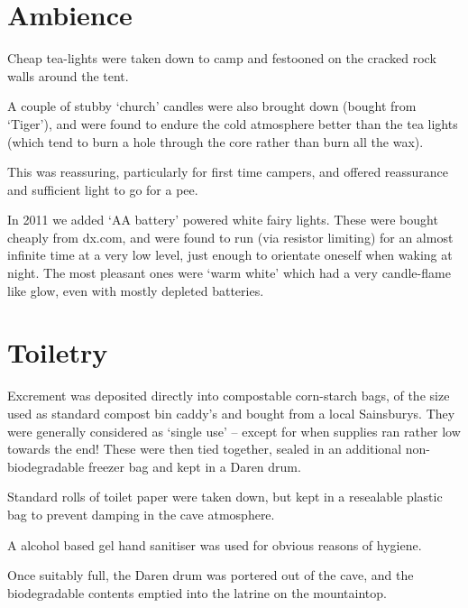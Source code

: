 \section{Ambience}

Cheap tea-lights were taken down to camp and festooned on the cracked rock walls around the tent.

A couple of stubby `church' candles were also brought down (bought from `Tiger'), and were found to endure the cold atmosphere better than the tea lights (which tend to burn a hole through the core rather than burn all the wax).

This was reassuring, particularly for first time campers, and offered reassurance and sufficient light to go for a pee.

In 2011 we added `AA battery' powered white fairy lights. These were bought cheaply from dx.com, and were found to run (via resistor limiting) for an almost infinite time at a very low level, just enough to orientate oneself when waking at night. The most pleasant ones were `warm white' which had a very candle-flame like glow, even with mostly depleted batteries.

\section{Toiletry}

Excrement was deposited directly into compostable corn-starch bags, of the size used as standard compost bin caddy's and bought from a local Sainsburys. They were generally considered as `single use' -- except for when supplies ran rather low towards the end! These were then tied together, sealed in an additional non-biodegradable freezer bag and kept in a Daren drum.

Standard rolls of toilet paper were taken down, but kept in a resealable plastic bag to prevent damping in the cave atmosphere.

A alcohol based gel hand sanitiser was used for obvious reasons of hygiene.

Once suitably full, the Daren drum was portered out of the cave, and the biodegradable contents emptied into the latrine on the mountaintop.

